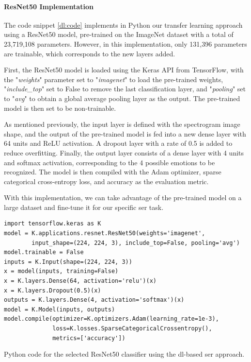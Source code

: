 \paragraph{ResNet50 Implementation}

The code snippet \ref{dl:code} implements in Python our transfer learning approach using a ResNet50 model, pre-trained on the ImageNet dataset with a total of 23,719,108 parameters. However, in this implementation, only 131,396 parameters are trainable, which corresponds to the new layers added.

First, the ResNet50 model is loaded using the Keras API from TensorFlow, with the "\textit{weights}" parameter set to "\textit{imagenet}" to load the pre-trained weights, "\textit{include\_top}" set to False to remove the last classification layer, and "\textit{pooling}" set to "\textit{avg}" to obtain a global average pooling layer as the output. The pre-trained model is then set to be non-trainable.

As mentioned previously, the input layer is defined with the spectrogram image shape, and the output of the pre-trained model is fed into a new dense layer with 64 units and ReLU activation. A dropout layer with a rate of 0.5 is added to reduce overfitting. Finally, the output layer consists of a dense layer with 4 units and softmax activation, corresponding to the 4 possible emotions to be recognized. The model is then compiled with the Adam optimizer, sparse categorical cross-entropy loss, and accuracy as the evaluation metric.

With this implementation, we can take advantage of the pre-trained model on a large dataset and fine-tune it for our specific \ac{ser} task.

\begin{listing}[H]
	\begin{verbatim}
import tensorflow.keras as K
model = K.applications.resnet.ResNet50(weights='imagenet',
		input_shape=(224, 224, 3), include_top=False, pooling='avg')
model.trainable = False
inputs = K.Input(shape=(224, 224, 3))
x = model(inputs, training=False)
x = K.layers.Dense(64, activation='relu')(x)
x = K.layers.Dropout(0.5)(x)
outputs = K.layers.Dense(4, activation='softmax')(x)
model = K.Model(inputs, outputs)
model.compile(optimizer=K.optimizers.Adam(learning_rate=1e-3),
			  loss=K.losses.SparseCategoricalCrossentropy(),
			  metrics=['accuracy'])
	\end{verbatim}
	\caption{Python code for the selected ResNet50 classifier using the \ac{dl}-based \ac{ser} approach.}
	\label{dl:code}
\end{listing}


